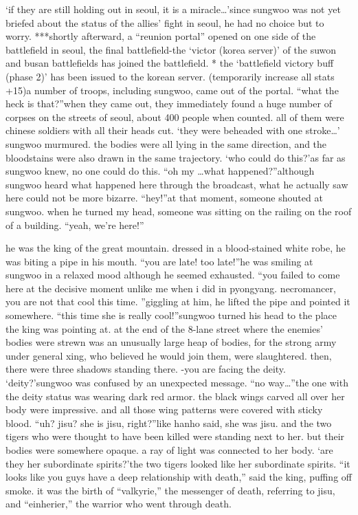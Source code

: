 ‘if they are still holding out in seoul, it is a miracle…’since sungwoo was not yet briefed about the status of the allies’ fight in seoul, he had no choice but to worry.
***shortly afterward, a “reunion portal” opened on one side of the battlefield in seoul, the final battlefield-the ‘victor (korea server)’ of the suwon and busan battlefields has joined the battlefield.
* the ‘battlefield victory buff (phase 2)’ has been issued to the korean server.
 (temporarily increase all stats +15)a number of troops, including sungwoo, came out of the portal.
“what the heck is that?”when they came out, they immediately found a huge number of corpses on the streets of seoul, about 400 people when counted.
 all of them were chinese soldiers with all their heads cut.
‘they were beheaded with one stroke…’ sungwoo murmured.
the bodies were all lying in the same direction, and the bloodstains were also drawn in the same trajectory.
‘who could do this?’as far as sungwoo knew, no one could do this.
“oh my …what happened?”although sungwoo heard what happened here through the broadcast, what he actually saw here could not be more bizarre.
“hey!”at that moment, someone shouted at sungwoo.
 when he turned my head, someone was sitting on the railing on the roof of a building.
“yeah, we’re here!”

he was the king of the great mountain.
 dressed in a blood-stained white robe, he was biting a pipe in his mouth.
“you are late! too late!”he was smiling at sungwoo in a relaxed mood although he seemed exhausted.
“you failed to come here at the decisive moment unlike me when i did in pyongyang.
 necromancer, you are not that cool this time.
”giggling at him, he lifted the pipe and pointed it somewhere.
“this time she is really cool!”sungwoo turned his head to the place the king was pointing at.
at the end of the 8-lane street where the enemies’ bodies were strewn was an unusually large heap of bodies, for the strong army under general xing, who believed he would join them, were slaughtered.
then, there were three shadows standing there.
-you are facing the deity.
‘deity?’sungwoo was confused by an unexpected message.
“no way…”the one with the deity status was wearing dark red armor.
 the black wings carved all over her body were impressive.
 and all those wing patterns were covered with sticky blood.
“uh? jisu? she is jisu, right?”like hanho said, she was jisu.
 and the two tigers who were thought to have been killed were standing next to her.
 but their bodies were somewhere opaque.
 a ray of light was connected to her body.
‘are they her subordinate spirits?’the two tigers looked like her subordinate spirits.
“it looks like you guys have a deep relationship with death,” said the king, puffing off smoke.
it was the birth of “valkyrie,” the messenger of death, referring to jisu, and “einherier,” the warrior who went through death.


 